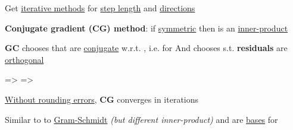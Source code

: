 Get \ul{iterative methods}
for \ul{step length}  and \ul{directions} 

\hSep %

\textbf{Conjugate gradient (CG) method}: if  \ul{symmetric} then
is an \ul{inner-product}
\begin{itemize}

      \vItem
            \textbf{GC} chooses  that are \ul{conjugate}
            w.r.t. ,
            i.e. 
            for 
      \vItem
            And chooses  s.t. \textbf{residuals}
            are \ul{orthogonal}

            \begin{itemize}

                  \vItem
                         =>
                  \vItem
                         =>
                  \vItem
            \end{itemize}
      \vItem
            \ul{Without rounding errors}, \textbf{CG} converges in  iterations


            \begin{itemize}

                  \vItem
                        Similar to to \ul{Gram-Schmidt} \emph{(but different inner-product)}
                  \vItem
                         and
                        are \ul{bases} for 
            \end{itemize}
\end{itemize}


